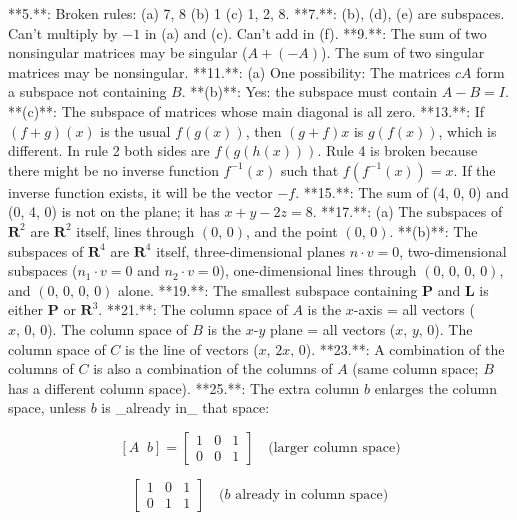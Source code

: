 

**5.**: Broken rules: (a) 7, 8 (b) 1 (c) 1, 2, 8.
**7.**: (b), (d), (e) are subspaces. Can't multiply by \(-1\) in (a) and (c). Can't add in (f).
**9.**: The sum of two nonsingular matrices may be singular (\(A+(-A)\)). The sum of two singular matrices may be nonsingular.
**11.**: (a) One possibility: The matrices \(cA\) form a subspace not containing \(B\).
**(b)**: Yes: the subspace must contain \(A-B=I\).
**(c)**: The subspace of matrices whose main diagonal is all zero.
**13.**: If \((f+g)(x)\) is the usual \(f(g(x))\), then \((g+f)x\) is \(g(f(x))\), which is different. In rule 2 both sides are \(f(g(h(x)))\). Rule 4 is broken because there might be no inverse function \(f^{-1}(x)\) such that \(f(f^{-1}(x))=x\). If the inverse function exists, it will be the vector \(-f\).
**15.**: The sum of (4, 0, 0) and (0, 4, 0) is not on the plane; it has \(x+y-2z=8\).
**17.**: (a) The subspaces of \(\mathbf{R}^{2}\) are \(\mathbf{R}^{2}\) itself, lines through \((0,\,0)\), and the point \((0,\,0)\).
**(b)**: The subspaces of \(\mathbf{R}^{4}\) are \(\mathbf{R}^{4}\) itself, three-dimensional planes \(n\cdot v=0\), two-dimensional subspaces (\(n_{1}\cdot v=0\) and \(n_{2}\cdot v=0\)), one-dimensional lines through \((0,\,0,\,0,\,0)\), and \((0,\,0,\,0,\,0)\) alone.
**19.**: The smallest subspace containing \(\mathbf{P}\) and \(\mathbf{L}\) is either \(\mathbf{P}\) or \(\mathbf{R}^{3}\).
**21.**: The column space of \(A\) is the \(x\)-axis = all vectors (\(x,\,0,\,0\)). The column space of \(B\) is the \(x\)-\(y\) plane = all vectors (\(x,\,y,\,0\)). The column space of \(C\) is the line of vectors (\(x,\,2x,\,0\)).
**23.**: A combination of the columns of \(C\) is also a combination of the columns of \(A\) (same column space; \(B\) has a different column space).
**25.**: The extra column \(b\) enlarges the column space, unless \(b\) is _already in_ that space:

\[[A\;\;b]=\begin{bmatrix}1&0&1\\ 0&0&1\end{bmatrix}\quad\text{(larger column space)}\]

\[\begin{bmatrix}1&0&1\\ 0&1&1\end{bmatrix}\quad\text{($b$ already in column space)}\]

